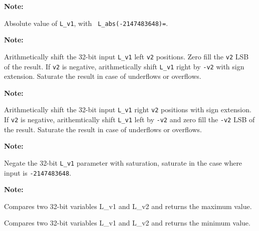 \textbf{Note:} \hfill {}


Absolute value of {\tt L\_v1}, with {\tt
L\_abs(-2147483648)=}.

\textbf{Note:} \hfill {}


Arithmetically shift the 32-bit input {\tt L\_v1} left {\tt v2}
positions. Zero fill the {\tt v2} LSB of the result. If {\tt v2}
is negative, arithmetically shift {\tt L\_v1} right by {\tt -v2}
with sign extension. Saturate the result in case of underflows or
overflows.

\textbf{Note:} \hfill {}


Arithmetically shift the 32-bit input {\tt L\_v1} right {\tt v2}
positions with sign extension. If {\tt v2} is negative,
arithemtically shift {\tt L\_v1} left by {\tt -v2} and zero fill
the {\tt -v2} LSB of the result. Saturate the result in case of
underflows or overflows.

\textbf{Note:} \hfill {}


Negate the 32-bit {\tt L\_v1} parameter with saturation, saturate in the
case where input is {\tt -2147483648}.

\textbf{Note:} \hfill {}

 

Compares two 32-bit variables L\_v1 and L\_v2 and returns the
maximum value.

 

Compares two 32-bit variables L\_v1 and L\_v2 and returns the
minimum value.


